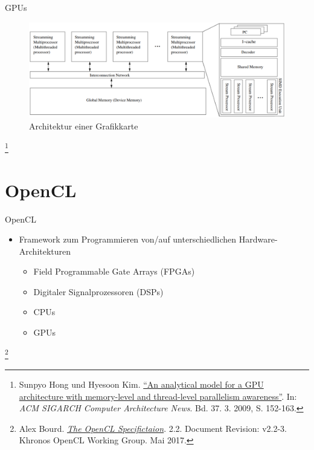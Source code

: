 \documentclass[10pt]{beamer}
\let\svthefootnote\thefootnote
\begin{document}
\begin{frame}{GPUs}
  \begin{figure}
    \centering
    \includegraphics[width=\linewidth]{figures/fg-gpu_architecture.pdf}
    \caption{Architektur einer Grafikkarte}
  \end{figure}

  \footnotesize
  \let\thefootnote\relax\footnote{Sunpyo Hong und Hyesoon Kim.
  \href{https://link.springer.com/article/10.1007\%2Fs00211-015-0757-y}{
  ``An analytical model for a GPU architecture with memory-level and thread-level parallelism awareness''}. In:   \textit{ACM SIGARCH Computer 
  Architecture News}. Bd. 37. 3. 2009, S. 152-163.}
  \addtocounter{footnote}{-1}\let\thefootnote\svthefootnote\relax
  \normalsize
\end{frame}

\section{OpenCL}

\begin{frame}{OpenCL}
  \begin{itemize}
    \item Framework zum Programmieren von/auf unterschiedlichen
          Hardware-Architekturen
    \begin{itemize}
      \item Field Programmable Gate Arrays (FPGAs)
      \item Digitaler Signalprozessoren (DSPs)
      \item CPUs
      \item GPUs
    \end{itemize}
  \end{itemize}

  \footnotesize
  \let\thefootnote\relax\footnote{Alex Bourd. \href{https://www.khronos.org/registry/OpenCL/specs/opencl-2.2.pdf}{\textit{The OpenCL Specifictaion}}. 2.2. Document Revision: v2.2-3. Khronos OpenCL Working Group. Mai 2017.}
  \addtocounter{footnote}{-1}\let\thefootnote\svthefootnote\relax
  \normalsize
\end{frame}
\end{document}
